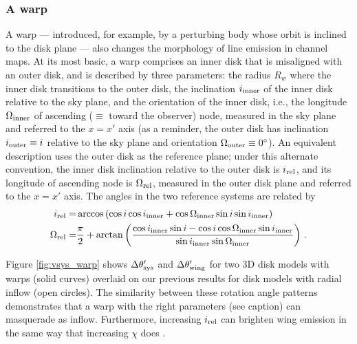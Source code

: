 \subsubsection{A warp}\label{warp}

A warp --- introduced, for example, by a perturbing body whose orbit is 
inclined to the disk plane \citep{larwood97,marzari09} --- also changes the 
morphology of line emission in channel maps.  At its most basic, a warp 
comprises an inner disk that is misaligned with an outer disk, and is described 
by three parameters: the radius $R_w$ where the inner disk transitions to the
outer disk, the inclination $i_{\rm inner}$ of the inner disk relative to the 
sky plane, and the orientation of the inner disk, i.e., the longitude 
$\Omega_{\rm inner}$ of ascending ($\equiv$ toward the observer) node, measured 
in the sky plane and referred to the $x=x'$ axis (as a reminder, the outer disk 
has inclination $i_{\rm outer} \equiv i$ relative to the sky plane and 
orientation $\Omega_{\rm outer} \equiv 0^\circ$).  An equivalent description 
uses the outer disk as the reference plane; under this alternate convention, 
the inner disk inclination relative to the outer disk is $i_{\rm rel}$, and its 
longitude of ascending node is $\Omega_{\rm rel}$, measured in the outer disk 
plane and referred to the $x=x'$ axis.  The angles in the two reference systems 
are related by
\begin{align}
i_{\rm rel}=&\arccos\left( \cos i \cos i_{\rm inner}+
    \cos \Omega_{\rm inner} \sin i \sin i_{\rm inner} \right) \\
\Omega_{\rm rel} =& \frac{\pi}{2} + 
    \arctan\left(\frac{\cos i_{\rm inner} \sin i - 
    \cos i \cos \Omega_{\rm inner} \sin i_{\rm inner} }{\sin i_{\rm inner} 
    \sin \Omega_{\rm inner} } \right) \,.
\end{align}

Figure \ref{fig:vsys_warp} shows $\Delta\theta'_{\rm sys}$ and 
$\Delta\theta'_{\rm wing}$ for two 3D disk models with warps (solid curves) 
overlaid on our previous results for disk models with radial inflow (open 
circles).  The similarity between these rotation angle patterns demonstrates 
that a warp with the right parameters (see caption) can masquerade as inflow.  
Furthermore, increasing $i_{\rm rel}$ can brighten wing emission in the same 
way that increasing $\chi$ does \citep[data not shown; see \S 
\ref{subsec:wingrot};][]{rosenfeld12}. 

